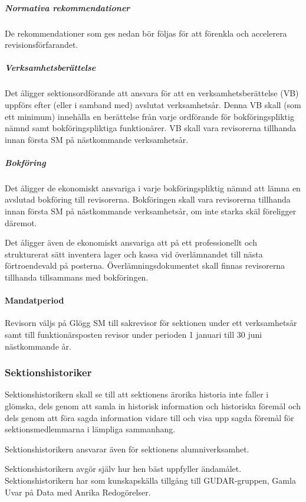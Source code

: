 \documentclass{dgovdoc}
\begin{document}
\subparagraph{Normativa rekommendationer}

De rekommendationer som ges nedan bör följas för att förenkla och accelerera
revisionsförfarandet.

\subparagraph{Verksamhetsberättelse}

Det åligger sektionsordförande att ansvara för att en verksamhetsberättelse
(VB) uppförs efter (eller i samband med) avslutat verksamhetsår. Denna VB skall
(som ett minimum) innehålla en berättelse från varje ordförande för
bokföringspliktig nämnd samt bokföringspliktiga funktionärer. VB skall vara
revisorerna tillhanda innan första SM på nästkommande verksamhetsår.

\subparagraph{Bokföring}

Det åligger de ekonomiskt ansvariga i varje bokföringspliktig nämnd att lämna
en avslutad bokföring till revisorerna. Bokföringen skall vara revisorerna
tillhanda innan första SM på nästkommande verksamhetsår, om inte starka skäl
föreligger däremot.

Det åligger även de ekonomiskt ansvariga att på ett professionellt och
strukturerat sätt inventera lager och kassa vid överlämnandet till nästa
förtroendevald på posterna. Överlämningsdokumentet skall finnas revisorerna
tillhanda tillsammans med bokföringen.

\paragraph{Mandatperiod}

Revisorn väljs på Glögg SM till sakrevisor för sektionen under ett
verksamhetsår samt till funktionärsposten revisor under perioden 1 januari till
30 juni nästkommande år.

\subsubsection{Sektionshistoriker}

Sektionshistorikern skall se till att sektionens ärorika historia inte faller i glömska, dels genom att samla in historisk information och historiska föremål och dels genom att föra sagda information vidare till och visa upp sagda föremål för sektionsmedlemmarna i lämpliga sammanhang.

Sektionshistorikern ansvarar även för sektionens alumniverksamhet.

Sektionshistorikern avgör själv hur hen bäst uppfyller ändamålet. Sektionshistorikern har som
kunskapskälla tillgång till GUDAR-gruppen, Gamla Uvar på Data med Anrika Redogörelser.
\end{document}
